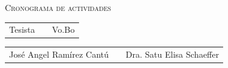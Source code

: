 \documentclass[landscape]{article}
\begin{document}
\begin{figure}[h]
\vspace{-3cm}
\begin{center} {\scshape\LARGE Cronograma de actividades \par} \end{center}
\vspace{0.2cm}
\hspace{3.5cm}
 \vspace{1cm}
      
\begin{tabular}{p{}cp{}}
  \centering Tesista & & \centering Vo.Bo \\
\end{tabular}

\begin{tabular}{p{}cp{}}
  \cline{1-1} \cline{3-3} \\
  \centering José Angel Ramírez Cantú & & \centering Dra. Satu Elisa Schaeffer 
\end{tabular}
\end{figure}

\end{document}
